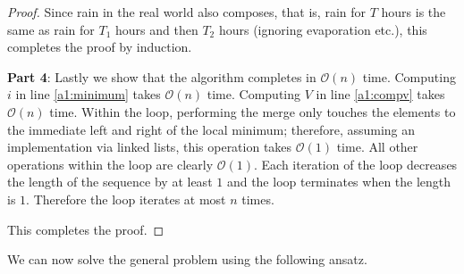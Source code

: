 \documentclass[11pt,a4paper]{article}
\newcommand{\bO}{\mathcal{O}}
\begin{document}
\begin{proof}
Since rain in the real world also composes, that is, rain for $T$ hours is the same as rain for $T_1$ hours and then $T_2$ hours (ignoring evaporation etc.), this completes the proof by induction.

\textbf{Part 4}: Lastly we show that the algorithm completes in $\bO(n)$ time.
Computing $i$ in line \ref{a1:minimum} takes $\bO(n)$ time.
Computing $V$ in line \ref{a1:compv} takes $\bO(n)$ time.
Within the loop, performing the merge only touches the elements to the immediate left and right of the local minimum; therefore, assuming an implementation via linked lists, this operation takes $\bO(1)$ time.
All other operations within the loop are clearly $\bO(1)$.
Each iteration of the loop decreases the length of the sequence by at least $1$ and the loop terminates when the length is $1$.
Therefore the loop iterates at most $n$ times.

This completes the proof.

\end{proof}

We can now solve the general problem using the following ansatz.
\end{document}
